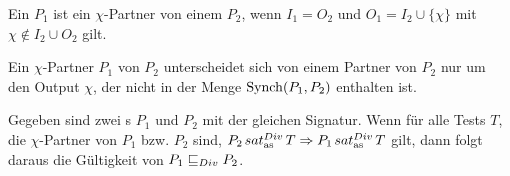 \begin{Def}
  Ein \MEIO{} $P_1$ ist ein $\chi$-Partner von einem \MEIO{} $P_2$, wenn
  $I_1=O_2$ und $O_1=I_2\cup\{\chi\}$ mit $\chi\notin I_2\cup O_2$ gilt.
\end{Def}

Ein $\chi$-Partner $P_1$ von $P_2$ unterscheidet sich von einem Partner von
$P_2$ nur um den Output $\chi$, der nicht in der Menge $\mathrm{Synch} (P_1,P_2)$
enthalten ist.

\begin{Lem}
  \label{DivTestVerfeinLem}
  Gegeben sind zwei \MEIO{}s $P_1$ und $P_2$ mit der gleichen Signatur. Wenn
  für alle Tests $T$, die $\chi$-Partner von $P_1$ bzw. $P_2$ sind, $P_2
  \hspace{0.05cm}sat_\mathrm{as}^{Div}\hspace{0.05cm} T\Rightarrow P_1 \hspace{0.05cm}sat_\mathrm{as}^{Div}\hspace{0.05cm} T$ gilt, dann folgt daraus die Gültigkeit
  von $P_1 \sqsubseteq  _{Div} P_2$.
\end{Lem}

